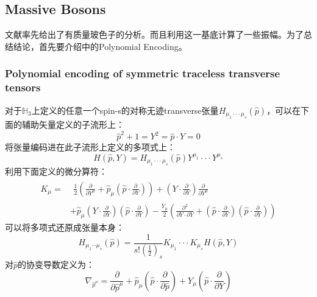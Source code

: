 \subsection{Massive Bosons}
文献\cite{Law:2020tsg}率先给出了有质量玻色子的分析。而且利用这一基底计算了一些振幅。为了总结结论，首先要介绍\cite{Costa:2011mg}中的Polynomial Encoding。
\subsubsection{Polynomial encoding of symmetric traceless transverse tensors}
对于$\mathbb{H}_3$上定义的任意一个spin\mbox{-s}的对称无迹transverse张量$H_{\mu_1\cdot\cdot\cdot\mu_s}(\hat{p})$，可以在下面的辅助矢量定义的子流形上：
\[\hat{p}^2+1=Y^2=\hat{p}\cdot Y=0\]
将张量编码进在此子流形上定义的多项式上：
\begin{equation}
	H(\hat{p},Y)=H_{\mu_1\cdot\cdot\cdot\mu_s}(\hat{p})Y^{\mu_1}\cdotp\cdotp\cdotp Y^{\mu_s}
\end{equation}
利用下面定义的微分算符：\sn{\[K_{\mu}K_{\nu}=K_{\nu}K_{\mu},\hat{p}^{\mu}K_{\mu}=0,K_{\mu}K^{\mu}=0\]}
\begin{equation}
	\begin{aligned}
		K_{\mu}=& \begin{aligned}\frac{1}{2}\left(\frac{\partial}{\partial Y^{\mu}}+\hat{p}_{\mu}\left(\hat{p}\cdot\frac{\partial}{\partial Y}\right)\right)+\left(Y\cdot\frac{\partial}{\partial Y}\right)\frac{\partial}{\partial Y^{\mu}}\end{aligned}  \\
		&+\hat{p}_{\mu}\left(Y\cdot\frac{\partial}{\partial Y}\right)\left(\hat{p}\cdot\frac{\partial}{\partial Y}\right)-\frac{Y_{\mu}}{2}\left(\frac{\partial^{2}}{\partial Y\cdot\partial Y}+\left(\hat{p}\cdot\frac{\partial}{\partial Y}\right)\left(\hat{p}\cdot\frac{\partial}{\partial Y}\right)\right)
	\end{aligned}
\end{equation}
可以将多项式还原成张量本身：
\begin{equation}
	H_{\mu_1\cdots\mu_s}(\hat{p})=\frac{1}{s!\left(\frac{1}{2}\right)_s}K_{\mu_1}\cdotp\cdotp\cdotp K_{\mu_s}H(\hat{p},Y)
\end{equation}
对$\hat p$的协变导数定义为：
\begin{equation}
	\nabla_{\hat{p}^{\mu}}=\frac{\partial}{\partial\hat{p}^{\mu}}+\hat{p}_{\mu}\left(\hat{p}\cdot\frac{\partial}{\partial\hat{p}}\right)+Y_{\mu}\left(\hat{p}\cdot\frac{\partial}{\partial Y}\right)
\end{equation}
